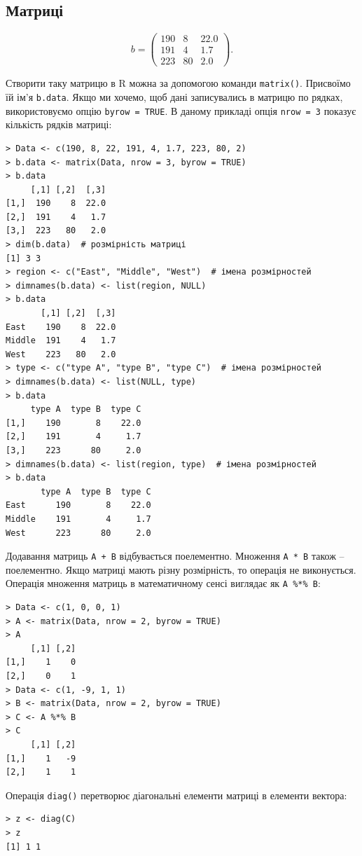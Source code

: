 \documentclass[a4paper, 12pt]{article}
\begin{document}
\subsection{Матриці}

\[ b = \begin{pmatrix}190  & 8  & 22.0 \\ 191  & 4  & 1.7 \\ 223  & 80  & 2.0\end{pmatrix}. \]

Створити таку матрицю в R можна за допомогою команди \verb|matrix()|. Присвоїмо їй ім’я \verb|b.data|. Якщо ми хочемо, щоб дані записувались в матрицю по рядках, використовуємо опцію \verb|byrow = TRUE|. В даному прикладі опція \verb|nrow = 3| показує кількість рядків матриці:
\begin{verbatim}
> Data <- c(190, 8, 22, 191, 4, 1.7, 223, 80, 2)
> b.data <- matrix(Data, nrow = 3, byrow = TRUE)
> b.data
     [,1] [,2]  [,3]
[1,]  190    8  22.0
[2,]  191    4   1.7
[3,]  223   80   2.0
> dim(b.data)  # розмірність матриці
[1] 3 3
> region <- c("East", "Middle", "West")  # імена розмірностей
> dimnames(b.data) <- list(region, NULL)
> b.data
       [,1] [,2]  [,3]
East    190    8  22.0
Middle  191    4   1.7
West    223   80   2.0
> type <- c("type A", "type B", "type C")  # імена розмірностей
> dimnames(b.data) <- list(NULL, type)
> b.data
     type A  type B  type C
[1,]    190       8    22.0
[2,]    191       4     1.7
[3,]    223      80     2.0
> dimnames(b.data) <- list(region, type)  # імена розмірностей
> b.data
       type A  type B  type C
East      190       8    22.0
Middle    191       4     1.7
West      223      80     2.0
\end{verbatim}
Додавання матриць \verb|А + В| відбувається поелементно. Множення \verb|А * В| також – поелементно. Якщо матриці мають різну розмірність, то операція не виконується. \\

Операція множення матриць в математичному сенсі виглядає як \verb|A %*% B|:
\begin{verbatim}
> Data <- c(1, 0, 0, 1)
> A <- matrix(Data, nrow = 2, byrow = TRUE)
> A
     [,1] [,2]
[1,]    1    0
[2,]    0    1
> Data <- c(1, -9, 1, 1)
> B <- matrix(Data, nrow = 2, byrow = TRUE)
> C <- A %*% B
> C
     [,1] [,2]
[1,]    1   -9
[2,]    1    1
\end{verbatim}

Операція \verb|diag()| перетворює діагональні елементи матриці в елементи вектора:
\begin{verbatim}
> z <- diag(C)
> z
[1] 1 1
\end{verbatim}
\end{document}
